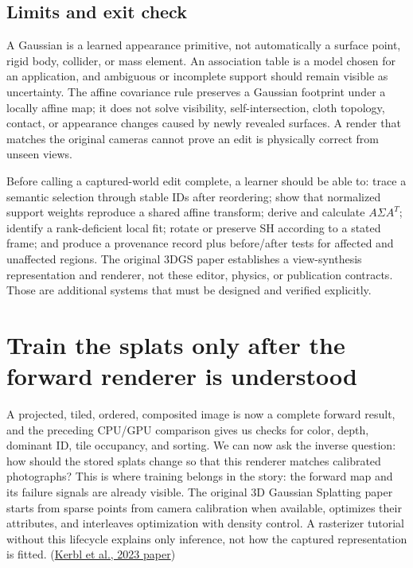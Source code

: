 \subsection{Limits and exit check}\label{04-visual-computing-ii-ch039-limits-and-exit-check}

\hypertarget{04-visual-computing-ii-ch039-limits-and-exit-check}{}

A Gaussian is a learned appearance primitive, not automatically a surface point, rigid body, collider, or mass element. An association table is a model chosen for an application, and ambiguous or incomplete support should remain visible as uncertainty. The affine covariance rule preserves a Gaussian footprint under a locally affine map; it does not solve visibility, self-intersection, cloth topology, contact, or appearance changes caused by newly revealed surfaces. A render that matches the original cameras cannot prove an edit is physically correct from unseen views.

Before calling a captured-world edit complete, a learner should be able to: trace a semantic selection through stable IDs after reordering; show that normalized support weights reproduce a shared affine transform; derive and calculate \(A\Sigma A^T\); identify a rank-deficient local fit; rotate or preserve SH according to a stated frame; and produce a provenance record plus before/after tests for affected and unaffected regions. The original 3DGS paper establishes a view-synthesis representation and renderer, not these editor, physics, or publication contracts. Those are additional systems that must be designed and verified explicitly.

\section{Train the splats only after the forward renderer is understood}\label{04-visual-computing-ii-ch039-train-the-splats-only-after-the-forward-renderer-is-understood}

\hypertarget{04-visual-computing-ii-ch039-train-the-splats-only-after-the-forward-renderer-is-understood}{}

A projected, tiled, ordered, composited image is now a complete forward result, and the preceding CPU/GPU comparison gives us checks for color, depth, dominant ID, tile occupancy, and sorting. We can now ask the inverse question: how should the stored splats change so that this renderer matches calibrated photographs? This is where training belongs in the story: the forward map and its failure signals are already visible. The original 3D Gaussian Splatting paper starts from sparse points from camera calibration when available, optimizes their attributes, and interleaves optimization with density control. A rasterizer tutorial without this lifecycle explains only inference, not how the captured representation is fitted. (\href{https://arxiv.org/abs/2308.04079}{Kerbl et al., 2023 paper})

